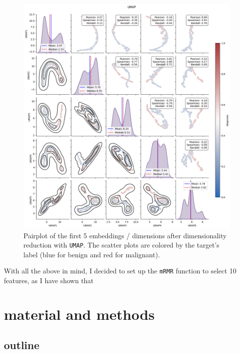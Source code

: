 \documentclass[12pt]{article}
\begin{document}
\begin{figure}[H]
    \centering
    \includegraphics[width=\textwidth]{ims/umap.png}
    \caption{Pairplot of the first 5 embeddings / dimensions after
    dimensionality reduction with \texttt{UMAP}. The scatter plots are colored
    by the target's label (blue for benign and red for malignant).}
    \label{fig:umap}
\end{figure}

With all the above in mind, I decided to set up the \texttt{mRMR} function to
select 10 features, as I have shown that 

\section{material and methods}

\subsection{outline}
\end{document}
